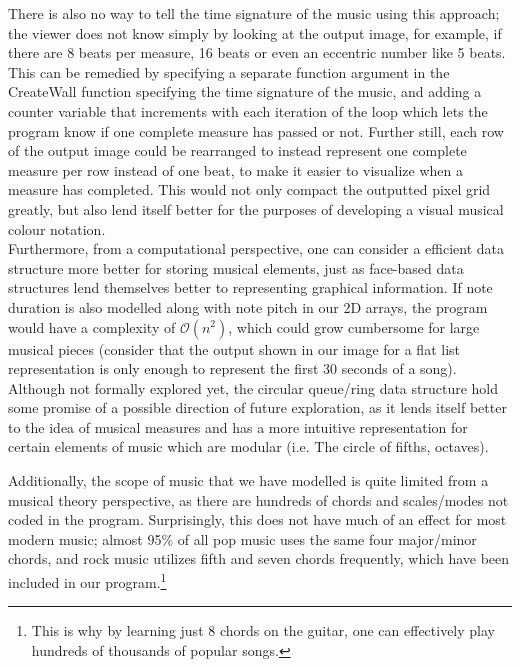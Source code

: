 \documentclass{article}
\begin{document}
There is also no way to tell the time signature of the music using this approach; the viewer does not know simply by looking at the output image, for example, if there are 8 beats per measure, 16 beats or even an eccentric number like 5 beats. This can be remedied by specifying a separate function argument in the CreateWall function specifying the time signature of the music, and adding a counter variable that increments with each iteration of the loop which lets the program know if one complete measure has passed or not. Further still, each row of the output image could be rearranged to instead represent one complete measure per row instead of one beat, to make it easier to visualize when a measure has completed. This would not only compact the outputted pixel grid greatly, but also lend itself better for the purposes of developing a visual musical colour notation.\\

Furthermore, from a computational perspective, one can consider a efficient data structure more better for storing musical elements, just as face-based data structures lend themselves better to representing graphical information. If note duration is also modelled along with note pitch in our 2D arrays, the program would have a complexity of $\mathcal{O}(n^2)$, which could grow cumbersome for large musical pieces (consider that the output shown in our image for a flat list representation is only enough to represent the first 30 seconds of a song). Although not formally explored yet, the circular queue/ring data structure hold some promise of a possible direction of future exploration, as it lends itself better to the idea of musical measures and has a more intuitive representation for certain elements of music which are modular (i.e. The circle of fifths, octaves).

Additionally, the scope of music that we have modelled is quite limited from a musical theory perspective, as there are hundreds of chords and scales/modes not coded in the program. Surprisingly, this does not have much of an effect for most modern music; almost 95\% of all pop music uses the same four major/minor chords, and rock music utilizes fifth and seven chords frequently, which have been included in our program.\footnote{This is why by learning just 8 chords on the guitar, one can effectively play hundreds of thousands of popular songs.}\\
\end{document}
